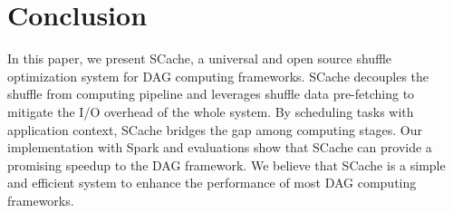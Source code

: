 \section{Conclusion}
 In this paper, we present SCache, a universal and open source shuffle optimization system for DAG computing frameworks. SCache decouples the shuffle from computing pipeline and leverages shuffle data pre-fetching to mitigate the I/O overhead of the whole system. By scheduling tasks with application context, SCache bridges the gap among computing stages. Our implementation with Spark and evaluations show that SCache can provide a promising speedup to the DAG framework. We believe that SCache is a simple and efficient system to enhance the performance of most DAG computing frameworks. 